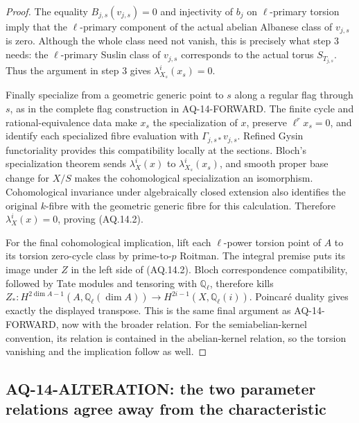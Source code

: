 \begin{proof}
The equality $B_{j,s}(v_{j,s})=0$ and injectivity of
$b_j$ on $\ell$-primary torsion imply that the
$\ell$-primary component of the actual abelian Albanese
class of $v_{j,s}$ is zero. Although the whole class
need not vanish, this is precisely what step 3 needs:
the $\ell$-primary Suslin class of $v_{j,s}$ corresponds
to the actual torus $S_{T_{j,s}}$. Thus the argument
in step 3 gives $\lambda_{X_s}^i(x_s)=0$.

Finally specialize from a geometric generic point to
$s$ along a regular flag through $s$, as in the complete
flag construction in AQ-14-FORWARD. The finite cycle
and rational-equivalence data make $x_s$ the
specialization of $x$, preserve $\ell^r x_s=0$, and
identify each specialized fibre evaluation with
$\Gamma_{j,s*}v_{j,s}$. Refined Gysin functoriality
provides this compatibility locally at the sections.
Bloch's specialization theorem sends
$\lambda_X^i(x)$ to $\lambda_{X_s}^i(x_s)$, and smooth
proper base change for $X/S$ makes the cohomological
specialization an isomorphism. Cohomological invariance
under algebraically closed extension also identifies
the original $k$-fibre with the geometric generic
fibre for this calculation. Therefore
$\lambda_X^i(x)=0$, proving (AQ.14.2).

For the final cohomological implication, lift each
$\ell$-power torsion point of $A$ to its torsion
zero-cycle class by prime-to-$p$ Roitman. The integral
premise puts its image under $Z$ in the left side of
(AQ.14.2). Bloch correspondence compatibility, followed
by Tate modules and tensoring with $\mathbb Q_\ell$,
therefore kills
$Z_*:H^{2\dim A-1}(A,\mathbb Q_\ell(\dim A))
\to H^{2i-1}(X,\mathbb Q_\ell(i))$.
Poincar\'e duality gives exactly the displayed transpose.
This is the same final argument as AQ-14-FORWARD, now
with the broader relation. For the semiabelian-kernel
convention, its relation is contained in the
abelian-kernel relation, so the torsion vanishing and
the implication follow as well.
\end{proof}

\subsection{AQ-14-ALTERATION: the two parameter relations agree away from the characteristic}

